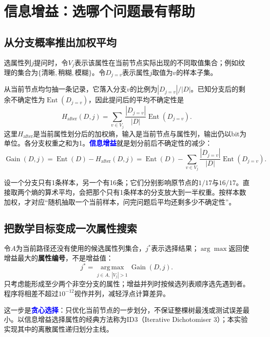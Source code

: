 \documentclass[UTF8,a4paper,11pt,fontset=fandol]{ctexart}
\numberwithin{equation}{subsection}
\newcommand{\term}[1]{\textcolor{Blue}{\textbf{#1}}}
\begin{document}
\clearpage
\section{信息增益：选哪个问题最有帮助}
\subsection{从分支概率推出加权平均}
选属性列$j$提问时，令$V_j$表示该属性在当前节点实际出现的不同取值集合；例如纹理的集合为$\{\text{清晰},\text{稍糊},\text{模糊}\}$。令$D_{j=v}$表示属性$j$取值为$v$的样本子集。

从当前节点均匀抽一条记录，它落入分支$v$的比例为$|D_{j=v}|/|D|$。已知分支后的剩余不确定性为$\operatorname{Ent}(D_{j=v})$，因此提问后的平均不确定性是
\begin{equation}
H_{\mathrm{after}}(D,j)
=\sum_{v\in V_j}\frac{|D_{j=v}|}{|D|}\operatorname{Ent}(D_{j=v}).
\end{equation}
这里$H_{\mathrm{after}}$是当前属性划分后的加权熵，输入是当前节点与属性列，输出仍以bit为单位。各分支权重之和为1。\term{信息增益}就是划分前后不确定性的减少：
\begin{equation}
\operatorname{Gain}(D,j)
=\operatorname{Ent}(D)-H_{\mathrm{after}}(D,j)
=\operatorname{Ent}(D)
-\sum_{v\in V_j}\frac{|D_{j=v}|}{|D|}\operatorname{Ent}(D_{j=v}).
\end{equation}

\begin{proofbox}[为什么不能把几个分支直接平均]
设一个分支只有1条样本，另一个有16条；它们分别影响原节点的$1/17$与$16/17$。直接取两个熵的算术平均，会把那个只有1条样本的分支放大到一半权重。按样本数加权，才对应“随机抽取一个当前样本，问完问题后平均还剩多少不确定性”。
\end{proofbox}

\subsection{把数学目标变成一次属性搜索}\label{sec:feature-selection}
令$A$为当前路径还没有使用的候选属性列集合，$j^*$表示选择结果；$\arg\max$返回使增益最大的\textbf{属性编号}，不是增益值：
\begin{equation}
j^*=\operatorname*{arg\,max}_{j\in A,\ |V_j|>1}\operatorname{Gain}(D,j).
\end{equation}
只考虑能形成至少两个非空分支的属性；增益并列时按候选列表顺序选先遇到者。程序将相差不超过$10^{-12}$视作并列，减轻浮点计算差异。

这一步是\term{贪心选择}：只优化当前节点的一步划分，不保证整棵树最浅或测试误差最小。以信息增益选择属性的经典方法称为ID3（Iterative Dichotomiser 3）；本实验实现其中的离散属性递归划分主线。
\end{document}
